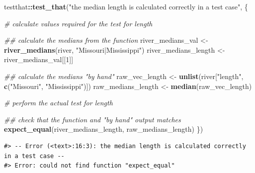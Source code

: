 \documentclass[
]{book}
\newenvironment{Shaded}{\begin{snugshade}}{\end{snugshade}}
\newcommand{\CommentTok}[1]{\textcolor[rgb]{0.56,0.35,0.01}{\textit{#1}}}
\newcommand{\DecValTok}[1]{\textcolor[rgb]{0.00,0.00,0.81}{#1}}
\newcommand{\KeywordTok}[1]{\textcolor[rgb]{0.13,0.29,0.53}{\textbf{#1}}}
\newcommand{\NormalTok}[1]{#1}
\newcommand{\OperatorTok}[1]{\textcolor[rgb]{0.81,0.36,0.00}{\textbf{#1}}}
\newcommand{\StringTok}[1]{\textcolor[rgb]{0.31,0.60,0.02}{#1}}
\begin{document}
\begin{Shaded}
\begin{Highlighting}[]
\NormalTok{testthat}\OperatorTok{::}\KeywordTok{test_that}\NormalTok{(}\StringTok{"the median length is calculated correctly in a test case"}\NormalTok{, \{}
  
  \CommentTok{# calculate values required for the test for length}

  \CommentTok{## calculate the medians from the function}
\NormalTok{  river_medians_val <-}\StringTok{ }\KeywordTok{river_medians}\NormalTok{(river, }\StringTok{"Missouri|Mississippi"}\NormalTok{)}
\NormalTok{  river_medians_length <-}\StringTok{ }\NormalTok{river_medians_val[[}\DecValTok{1}\NormalTok{]]}

  \CommentTok{## calculate the medians "by hand"}
\NormalTok{  raw_vec_length <-}\StringTok{ }\KeywordTok{unlist}\NormalTok{(river[}\StringTok{"length"}\NormalTok{, }\KeywordTok{c}\NormalTok{(}\StringTok{"Missouri"}\NormalTok{, }\StringTok{"Mississippi"}\NormalTok{)])}
\NormalTok{  raw_medians_length <-}\StringTok{ }\KeywordTok{median}\NormalTok{(raw_vec_length)}
  
  \CommentTok{# perform the actual test for length}

  \CommentTok{## check that the function and "by hand" output matches}
  \KeywordTok{expect_equal}\NormalTok{(river_medians_length, raw_medians_length)}
\NormalTok{\})}
\end{Highlighting}
\end{Shaded}

\begin{verbatim}
#> -- Error (<text>:16:3): the median length is calculated correctly in a test case --
#> Error: could not find function "expect_equal"
\end{verbatim}
\end{document}
